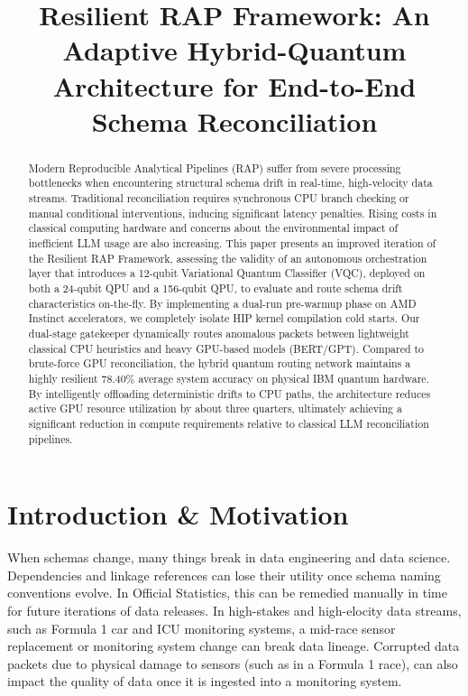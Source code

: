 \documentclass[journal]{IEEEtran}
\begin{document}
\title{Resilient RAP Framework: An Adaptive Hybrid-Quantum Architecture for End-to-End Schema Reconciliation}
\maketitle

\begin{abstract}
Modern Reproducible Analytical Pipelines (RAP) suffer from severe processing bottlenecks when encountering structural schema drift in real-time, high-velocity data streams. Traditional reconciliation requires synchronous CPU branch checking or manual conditional interventions, inducing significant latency penalties. Rising costs in classical computing hardware and concerns about the environmental impact of inefficient LLM usage are also increasing. This paper presents an improved iteration of the Resilient RAP Framework, assessing the validity of an autonomous orchestration layer that introduces a 12-qubit Variational Quantum Classifier (VQC), deployed on both a 24-qubit QPU and a 156-qubit QPU, to evaluate and route schema drift characteristics on-the-fly. By implementing a dual-run pre-warmup phase on AMD Instinct accelerators, we completely isolate HIP kernel compilation cold starts. Our dual-stage gatekeeper dynamically routes anomalous packets between lightweight classical CPU heuristics and heavy GPU-based models (BERT/GPT). Compared to brute-force GPU reconciliation, the hybrid quantum routing network maintains a highly resilient 78.40\% average system accuracy on physical IBM quantum hardware. By intelligently offloading deterministic drifts to CPU paths, the architecture reduces active GPU resource utilization by about three quarters, ultimately achieving a significant reduction in compute requirements relative to classical LLM reconciliation pipelines.
\end{abstract}

\section{Introduction \& Motivation}
When schemas change, many things break in data engineering and data science. Dependencies and linkage references can lose their utility once schema naming conventions evolve. In Official Statistics, this can be remedied manually in time for future iterations of data releases. In high-stakes and high-elocity data streams, such as Formula 1 car and ICU monitoring systems, a mid-race sensor replacement or monitoring system change can break data lineage. Corrupted data packets due to physical damage to sensors (such as in a Formula 1 race), can also impact the quality of data once it is ingested into a monitoring system. 
\end{document}
